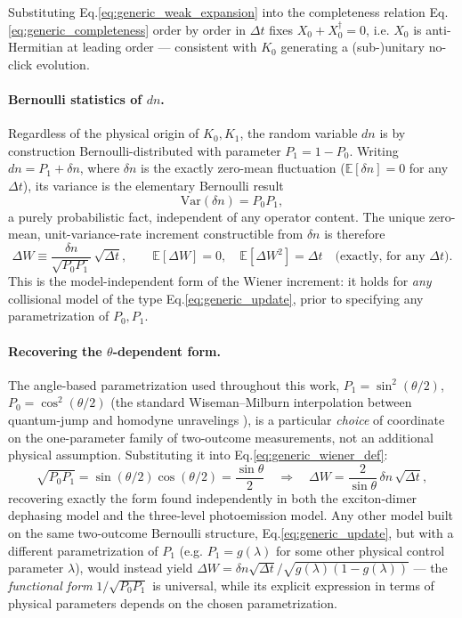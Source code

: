 \documentclass[a4paper,12pt]{article}
\begin{document}
Substituting Eq.\ref{eq:generic_weak_expansion} into the completeness relation Eq.\ref{eq:generic_completeness} order by order in $\Delta t$ fixes $X_{0}+X_{0}^{\dagger}=0$, i.e. $X_0$ is anti-Hermitian at leading order — consistent with $K_0$ generating a (sub-)unitary no-click evolution.

\paragraph{Bernoulli statistics of $dn$.}
Regardless of the physical origin of $K_0,K_1$, the random variable $dn$ is by construction Bernoulli-distributed with parameter $P_{1}=1-P_{0}$. Writing $dn = P_{1} + \delta n$, where $\delta n$ is the exactly zero-mean fluctuation ($\mathbb{E}[\delta n]=0$ for any $\Delta t$), its variance is the elementary Bernoulli result
\begin{equation}
	\mathrm{Var}(\delta n) = P_{0}P_{1},
	\label{eq:generic_bernoulli_variance}
\end{equation}
a purely probabilistic fact, independent of any operator content. The unique zero-mean, unit-variance-rate increment constructible from $\delta n$ is therefore
\begin{equation}
	\boxed{\Delta W \equiv \frac{\delta n}{\sqrt{P_{0}P_{1}}}\,\sqrt{\Delta t}}, \qquad \mathbb{E}[\Delta W]=0, \quad \mathbb{E}[\Delta W^{2}] = \Delta t \quad \text{(exactly, for any } \Delta t \text{)}.
	\label{eq:generic_wiener_def}
\end{equation}
This is the model-independent form of the Wiener increment: it holds for \emph{any} collisional model of the type Eq.\ref{eq:generic_update}, prior to specifying any parametrization of $P_0, P_1$.

\paragraph{Recovering the $\theta$-dependent form.}
The angle-based parametrization used throughout this work, $P_{1}=\sin^{2}(\theta/2)$, $P_{0}=\cos^2(\theta/2)$ (the standard Wiseman--Milburn interpolation between quantum-jump and homodyne unravelings \cite{WisemanMilburn1993}), is a particular \emph{choice} of coordinate on the one-parameter family of two-outcome measurements, not an additional physical assumption. Substituting it into Eq.\ref{eq:generic_wiener_def}:
\begin{equation}
	\sqrt{P_{0}P_{1}} = \sin(\theta/2)\cos(\theta/2) = \frac{\sin\theta}{2} \quad\Longrightarrow\quad \Delta W = \frac{2}{\sin\theta}\,\delta n\,\sqrt{\Delta t},
	\label{eq:generic_to_theta}
\end{equation}
recovering exactly the form found independently in both the exciton-dimer dephasing model and the three-level photoemission model. Any other model built on the same two-outcome Bernoulli structure, Eq.\ref{eq:generic_update}, but with a different parametrization of $P_1$ (e.g. $P_1=g(\lambda)$ for some other physical control parameter $\lambda$), would instead yield $\Delta W = \delta n\sqrt{\Delta t}/\sqrt{g(\lambda)(1-g(\lambda))}$ — the \emph{functional form} $1/\sqrt{P_0P_1}$ is universal, while its explicit expression in terms of physical parameters depends on the chosen parametrization.
\end{document}

